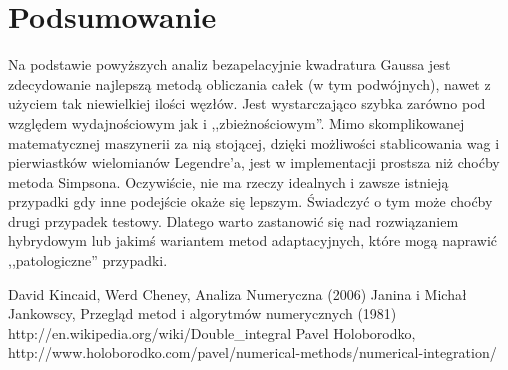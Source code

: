 \documentclass[11pt,leqno]{article}
\begin{document}
\section{Podsumowanie}
Na podstawie powyższych analiz bezapelacyjnie kwadratura Gaussa jest zdecydowanie najlepszą metodą obliczania całek (w tym podwójnych), nawet z użyciem tak niewielkiej ilości węzłów. Jest wystarczająco szybka zarówno pod względem wydajnościowym jak i ,,zbieżnościowym''. Mimo skomplikowanej matematycznej maszynerii za nią stojącej, dzięki możliwości stablicowania wag i pierwiastków wielomianów Legendre'a, jest w implementacji prostsza niż choćby metoda Simpsona. Oczywiście, nie ma rzeczy idealnych i zawsze istnieją przypadki gdy inne podejście okaże się lepszym. Świadczyć o tym może choćby drugi przypadek testowy. Dlatego warto zastanowić się nad rozwiązaniem hybrydowym lub jakimś wariantem metod adaptacyjnych, które mogą naprawić ,,patologiczne'' przypadki.


\begin{thebibliography}{99}
 David Kincaid, Werd Cheney, Analiza Numeryczna (2006)
 Janina i Michał Jankowscy, Przegląd metod i algorytmów numerycznych (1981)
 http://en.wikipedia.org/wiki/Double\_integral
 Pavel Holoborodko, http://www.holoborodko.com/pavel/numerical-methods/numerical-integration/
\end{thebibliography}
\end{document}
